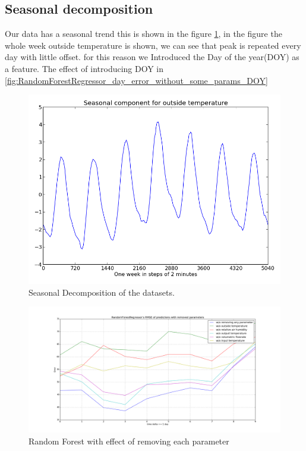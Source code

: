 \documentclass{scrartcl}
\begin{document}
\subsection{Seasonal decomposition}
Our data has a seasonal trend this is shown in the figure \ref{fig:season_outside_temperature}, in the figure the whole week outside temperature is shown, we can see that peak is repeated every day with little offset. for this reason we Introduced the Day of the year(DOY) as a feature. The effect of introducing DOY in \ref{fig:RandomForestRegressor_day_error_without_some_params_DOY} 
\begin{figure}[H]
  \includegraphics[width=0.6\linewidth]{img/season-outside_temperature.png}
  \caption{Seasonal Decomposition of the datasets.}
  \label{fig:season_outside_temperature}
\end{figure}

\begin{figure}[H]
  \center
  \includegraphics[width=1\linewidth]{img/RandomForestRegressor_day_error_without_some_params.png}
  \caption{Random Forest with effect of removing each parameter}
  \label{fig:RandomForestRegressor_day_error_without_some_params}
\end{figure}
\end{document}
